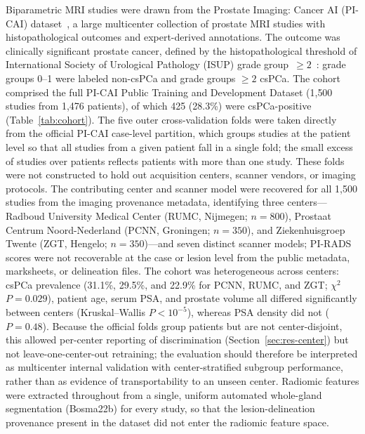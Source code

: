 \documentclass[11pt]{article}
\begin{document}
Biparametric MRI studies were drawn from the Prostate Imaging: Cancer AI
(PI-CAI) dataset~\citep{saha2023artificial}, a large multicenter collection of
prostate MRI studies with histopathological outcomes and expert-derived
annotations. The outcome was clinically significant prostate cancer, defined by
the histopathological threshold of International Society of Urological Pathology
(ISUP) grade group~$\geq 2$~\citep{epstein2016grade}: grade groups 0--1 were
labeled non-csPCa and grade groups $\geq 2$ csPCa. The cohort comprised the full
PI-CAI Public Training and Development Dataset (1{,}500 studies from 1{,}476
patients), of which 425 (28.3\%) were csPCa-positive
(Table~\ref{tab:cohort}). The five outer cross-validation folds were taken
directly from the official PI-CAI case-level partition, which groups studies at
the patient level so that all studies from a given patient fall in a single
fold; the small excess of studies over patients reflects patients with more than
one study. These folds were not constructed to hold out acquisition centers,
scanner vendors, or imaging protocols. The contributing center and scanner model
were recovered for all 1{,}500 studies from the imaging provenance metadata,
identifying three centers---Radboud University Medical Center (RUMC, Nijmegen;
$n=800$), Prostaat Centrum Noord-Nederland (PCNN, Groningen; $n=350$), and
Ziekenhuisgroep Twente (ZGT, Hengelo; $n=350$)---and seven distinct scanner
models; PI-RADS scores were not recoverable at the case or lesion level from the
public metadata, marksheets, or delineation files. The cohort was heterogeneous
across centers: csPCa prevalence (31.1\%, 29.5\%, and 22.9\% for PCNN, RUMC, and
ZGT; $\chi^2$ $P=0.029$), patient age, serum PSA, and prostate volume all
differed significantly between centers (Kruskal--Wallis $P<10^{-5}$), whereas
PSA density did not ($P=0.48$). Because the official folds group patients but are
not center-disjoint, this allowed per-center reporting of discrimination
(Section~\ref{sec:res-center}) but not leave-one-center-out retraining; the
evaluation should therefore be interpreted as multicenter internal validation
with center-stratified subgroup performance, rather than as evidence of
transportability to an unseen center. Radiomic features were extracted throughout
from a single, uniform automated whole-gland segmentation (Bosma22b) for every
study, so that the lesion-delineation provenance present in the dataset did not
enter the radiomic feature space.
\end{document}
